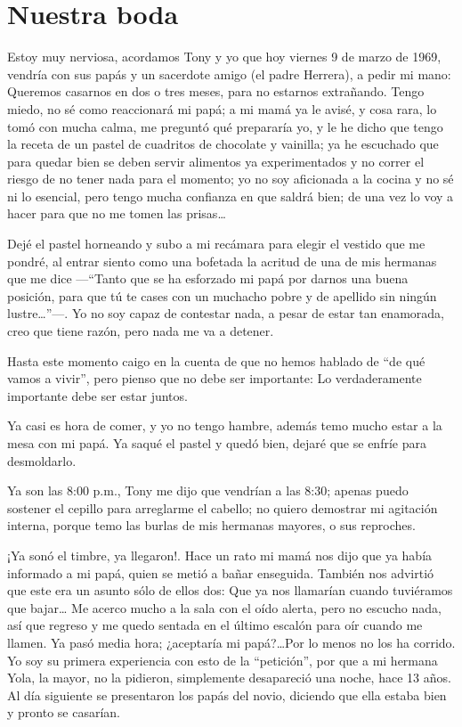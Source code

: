 \documentclass[letterpaper, 12pt]{book}
\begin{document}
\chapter{Nuestra boda}
Estoy muy nerviosa, acordamos Tony y yo que hoy viernes 9 de  marzo de 1969, vendría con sus papás y un sacerdote amigo (el padre Herrera), a pedir mi mano: Queremos casarnos en dos o tres meses, para no estarnos extrañando.  Tengo miedo, no sé como reaccionará mi papá; a mi mamá ya le avisé, y cosa rara, lo tomó con mucha calma, me preguntó qué prepararía yo, y le he dicho que tengo la receta de un pastel de cuadritos de chocolate y vainilla; ya he escuchado que para quedar bien se deben servir alimentos ya experimentados y no correr el riesgo de no tener nada para el momento; yo no soy aficionada a la cocina y no sé ni lo esencial, pero tengo mucha confianza en que saldrá bien; de una vez lo voy a hacer para que no me tomen las prisas\ldots

Dejé el pastel horneando y subo a mi recámara para elegir el vestido que me pondré, al entrar siento como una bofetada la acritud de una de mis hermanas que me dice ---``Tanto que se ha esforzado mi papá por darnos una buena posición, para que tú te cases con un muchacho pobre y de apellido sin ningún lustre\ldots''---. Yo no soy capaz de contestar nada, a pesar de estar tan enamorada, creo que tiene razón, pero nada me va a detener. 
 
Hasta este momento caigo en la cuenta de que no hemos hablado de ``de qué vamos a vivir'', pero pienso que no debe ser importante: Lo verdaderamente importante debe ser estar juntos.

Ya casi es hora de comer, y yo no tengo hambre, además temo mucho estar a la mesa con mi papá. Ya saqué el pastel y quedó bien, dejaré que se enfríe para desmoldarlo.

Ya son las 8:00 p.m., Tony me dijo que vendrían a las 8:30; apenas puedo sostener el cepillo para arreglarme el cabello; no quiero demostrar mi agitación interna, porque temo las burlas de mis hermanas mayores, o sus reproches.

¡Ya sonó el timbre, ya llegaron!. Hace un rato mi mamá nos dijo que ya había informado a mi papá, quien se metió a bañar enseguida. También nos advirtió que este era un asunto sólo de ellos dos: Que ya nos llamarían cuando tuviéramos que bajar\ldots
Me acerco mucho a la sala con el oído alerta, pero no escucho nada, así que regreso y me quedo sentada en el último escalón para oír cuando me llamen. Ya pasó media hora; ¿aceptaría mi papá?\ldots Por lo menos no los ha corrido. Yo soy su primera experiencia con esto de la ``petición'', por que a mi hermana Yola, la mayor, no la pidieron, simplemente desapareció una noche, hace 13 años.  Al día siguiente se presentaron los papás del novio, diciendo que ella estaba bien y pronto se casarían.
\end{document}
